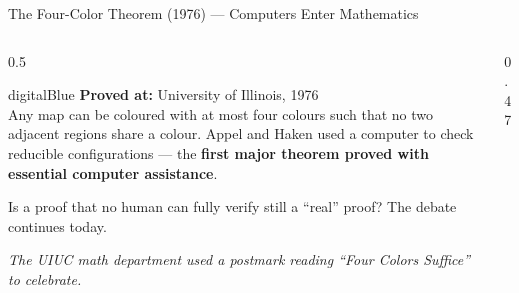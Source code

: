 \begin{frame}[shrink=23]{The Four-Color Theorem (1976) --- Computers Enter Mathematics}

  \begin{columns}[T]
    \begin{column}{0.5\textwidth}
      \begin{personbox}{digitalBlue}
        \textbf{Proved at:} University of Illinois, 1976\\[3pt]
        Any map can be coloured with at most \alert{four colours} such that
        no two adjacent regions share a colour. Appel and Haken used a
        computer to check reducible configurations --- the \textbf{first
        major theorem proved with essential computer assistance}.
      \end{personbox}

      \vspace{0.3em}
      \begin{insightbox}
        Is a proof that no human can fully verify still a ``real'' proof?
        The debate continues today.
      \end{insightbox}

      \vspace{0.2em}
      {\scriptsize\itshape The UIUC math department used a postmark reading
      ``Four Colors Suffice'' to celebrate.}
    \end{column}

    \begin{column}{0.47\textwidth}
    \end{column}
  \end{columns}

\end{frame}

